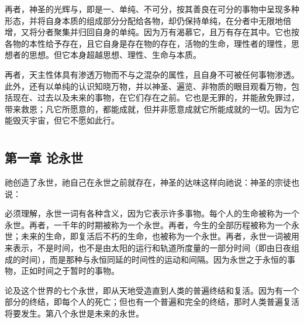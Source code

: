 再者，神圣的光辉与，即是一、单纯、不可分，按其善良在可分的事物中呈现多种形态，并将自身本质的组成部分分配给各物，却仍保持单纯，在分者中无限地倍增，又将分者聚集并归回自身的单纯。因为万有渴慕它，且万有存在其中。它也按各物的本性给予存在，且它自身是存在物的存在，活物的生命，理性者的理性，思想者的思想。但它本身超越思想、理性、生命与本质。\par

再者，天主性体具有渗透万物而不与之混杂的属性，且自身不可被任何事物渗透。此外，还有以单纯的认识知晓万物，并以神圣、遍览、非物质的眼目观看万物，包括现在、过去以及未来的事物，在它们存在之前。它也是无罪的，并能赦免罪过，带来救恩；凡它所愿意的，都能成就，但并非愿意成就它所能成就的一切。因为它能毁灭宇宙，但它不愿如此行。\par



\section{}


\subsection{第一章 论永世}

祂创造了永世，祂自己在永世之前就存在，神圣的达味这样向祂说：神圣的宗徒也说：\par

必须理解，永世一词有各种含义，因为它表示许多事物。每个人的生命被称为一个永世。再者，一千年的时期被称为一个永世。再者，今生的全部历程被称为一个永世；未来的生命，即复活后不朽的生命，也被称为一个永世。再者，永世一词被用来表示，不是时间，也不是由太阳的运行和轨道所度量的一部分时间（即由日夜组成的时间），而是那种与永恒同延的时间性的运动和间隔。因为永世之于永恒的事物，正如时间之于暂时的事物。\par

论及这个世界的七个永世，即从天地受造直到人类的普遍终结和复活。因为有一个部分的终结，即每个人的死亡；但也有一个普遍和完全的终结，那时人类普遍复活将要发生。第八个永世是未来的永世。\par

